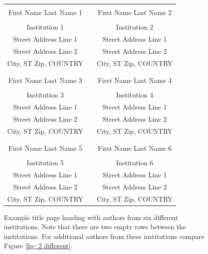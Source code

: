 \documentclass{article}
\begin{document}
\begin{figure}[htb]
{
\centering
\begin{tabular}{ccc}
\phantom{Adjust spacing using these entries} & \phantom{intermediate space} & \phantom{Adjust spacing using these entries} \\
First Name Last Name 1 & & First Name Last Name 2 \\
\\
Institution 1 & & Institution 2 \\
Street Address Line 1 & & Street Address Line 1 \\
Street Address Line 2 & & Street Address Line 2 \\
City, ST Zip, COUNTRY & & City, ST Zip, COUNTRY \\
\\ \\
First Name Last Name 3 & & First Name Last Name 4 \\
\\
Institution 3 & & Institution 4 \\
Street Address Line 1 & & Street Address Line 1 \\
Street Address Line 2 & & Street Address Line 2 \\
City, ST Zip, COUNTRY & & City, ST Zip, COUNTRY \\
\\ \\
First Name Last Name 5 & & First Name Last Name 6 \\
\\
Institution 5 & & Institution 6 \\
Street Address Line 1 & & Street Address Line 1 \\
Street Address Line 2 & & Street Address Line 2 \\
City, ST Zip, COUNTRY & & City, ST Zip, COUNTRY
\end{tabular}
\caption{Example title page heading with authors from six different institutions. Note that there are two empty rows between the institutions. For additional authors from these institutions compare Figure \ref{fig: 2 different}. \label{fig: 6 different}}
}
\end{figure}
\end{document}
